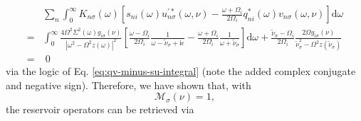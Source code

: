 \begin{equation}
\begin{split}
&\sum_n\int_0^\infty K_{n\sigma}(\omega)\left[s_{ni}(\omega)u^{\prime*}_{n\sigma}(\omega,\nu) - \frac{\omega + \Omega_i}{2\Omega_i}q_{ni}^*(\omega)v_{n\sigma}(\omega,\nu)\right]\mathrm{d}\omega\\
= &\int_0^\infty\frac{4\Omega^2\Sigma^2(\omega)g_{i\sigma}(\nu)}{|\omega^2 - \Omega^2z(\omega)|^2}\left[\frac{\omega - \Omega_i}{2\Omega_i}\frac{1}{\omega - \tilde{\nu}_\sigma + \mathrm{i}\epsilon} - \frac{\omega + \Omega_i}{2\Omega_i}\frac{1}{\omega + \tilde{\nu}_\sigma}\right]\mathrm{d}\omega + \frac{\tilde{\nu}_\sigma - \Omega_i}{2\Omega_i}\frac{2\Omega g_{i\sigma}(\nu)}{\tilde{\nu}_\sigma^2 - \Omega^2z(\tilde{\nu}_\sigma)}\\
= &\;0
\end{split}
\end{equation}
via the logic of Eq. \eqref{eq:qv-minus-su-integral} (note the added complex conjugate and negative sign). Therefore, we have shown that, with
\begin{equation}
\mathcal{M}_\sigma(\nu) = 1,
\end{equation}
the reservoir operators can be retrieved via
